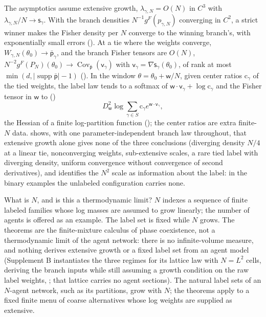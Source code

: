 The asymptotics assume extensive growth, $\lambda_{\gamma,N}=O(N)$ in $C^3$ with
$\lambda_{\gamma,N}/N\to\mathsf s_\gamma$. With the branch densities $N^{-1}g^F(p_{\gamma,N})$ converging in
$C^2$, a strict winner makes the Fisher density per $N$ converge to the winning branch's, with
exponentially small errors (). At a tie where the weights converge,
$W_{\gamma,N}(\theta_0)\to\bar{\mathsf p}_\gamma$, and the branch Fisher tensors are $O(N)$,
$N^{-2}g^F(P_N)(\theta_0)\to\operatorname{Cov}_{\bar{\mathsf p}}(\mathsf v_\gamma)$ with
$\mathsf v_\gamma=\nabla\mathsf s_\gamma(\theta_0)$, of rank at most
$\min(d,\lvert\operatorname{supp}\bar{\mathsf p}\rvert-1)$ (). In the
window $\theta=\theta_0+\mathsf w/N$, given center ratios $\mathrm c_\gamma$ of the tied weights, the
label law tends to a softmax of $\mathsf w\cdot\mathsf v_\gamma+\log\mathrm c_\gamma$ and the Fisher
tensor in $\mathsf w$ to ()
\[
D^2_{\mathsf w}\log\sum_{\gamma\in S}\mathrm c_\gamma e^{\mathsf w\cdot\mathsf v_\gamma},
\]
the Hessian of a finite log-partition function (); the center ratios
are extra finite-$N$ data.  shows, with one
parameter-independent branch law throughout, that extensive growth alone gives none of the three
conclusions (diverging density $N/4$ at a linear tie, nonconverging weights, sub-extensive scales, a rare
tied label with diverging density, uniform convergence without convergence of second derivatives), and
 identifies the $N^2$ scale as information about the label: in the binary
examples the unlabeled configuration carries none.

What is $N$, and is this a thermodynamic limit? $N$ indexes a sequence of finite labeled families whose
log masses are assumed to grow linearly; the number of agents is offered as an example. The label set is
fixed while $N$ grows. The theorems are the finite-mixture calculus of phase coexistence, not a
thermodynamic limit of the agent network: there is no infinite-volume measure, and nothing derives
extensive growth or a fixed label set from an agent model (Supplement B instantiates the three regimes
for its lattice law with $N=L^2$ cells, deriving the branch inputs while still assuming a growth
condition on the raw label weights, ; that lattice carries no agent
sections). The natural label sets of an $N$-agent
network, such as its partitions, grow with $N$; the theorems apply to a fixed finite menu of coarse
alternatives whose log weights are supplied as extensive.

